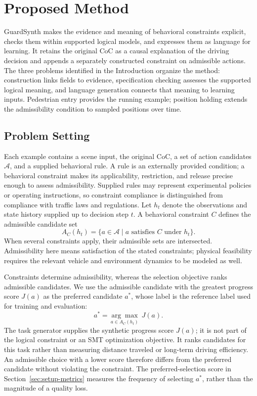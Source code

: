 \section{Proposed Method}\label{sec:method}

GuardSynth makes the evidence and meaning of behavioral constraints explicit,
checks them within supported logical models, and expresses them as language for
learning. It retains the original CoC as a causal explanation of the driving
decision and appends a separately constructed constraint on admissible actions.
The three problems identified in the Introduction organize the method:
construction links fields to evidence, specification checking assesses the
supported logical meaning, and language generation connects that meaning to
learning inputs. Pedestrian entry provides the running example; position
holding extends the admissibility condition to sampled positions over time.

\subsection{Problem Setting}\label{sec:method-problem}

Each example contains a scene input, the original CoC, a set of action candidates
$\mathcal{A}$, and a supplied behavioral rule. A rule is an externally provided
condition; a behavioral constraint makes its applicability, restriction, and
release precise enough to assess admissibility. Supplied rules may represent
experimental policies or operating instructions, so constraint compliance is
distinguished from compliance with traffic laws and regulations.
Let $h_t$ denote the observations and state
history supplied up to decision step $t$. A behavioral constraint $C$ defines
the admissible candidate set
\begin{equation}
A_C(h_t)=\{a\in\mathcal{A}\mid a\text{ satisfies }C\text{ under }h_t\}.
\end{equation}
When several constraints apply, their admissible sets are intersected.
Admissibility here means satisfaction of the stated constraints; physical
feasibility requires the relevant vehicle and environment dynamics to be
modeled as well.

Constraints determine admissibility, whereas the selection objective ranks
admissible candidates. We use the admissible candidate with the greatest
progress score $J(a)$ as the preferred candidate $a^\ast$, whose label is the
reference label used for training and evaluation:
\begin{equation}
a^\ast=\underset{a\in A_C(h_t)}{\arg\max}\;J(a).
\end{equation}
The task generator supplies the synthetic progress score $J(a)$; it is not
part of the logical constraint or an SMT optimization objective. It ranks
candidates for this task rather than measuring distance traveled or long-term
driving efficiency. An admissible choice with a lower score therefore differs
from the preferred candidate without violating the constraint. The
preferred-selection score in Section~\ref{sec:setup-metrics} measures the
frequency of selecting $a^\ast$, rather than the magnitude of a quality loss.


